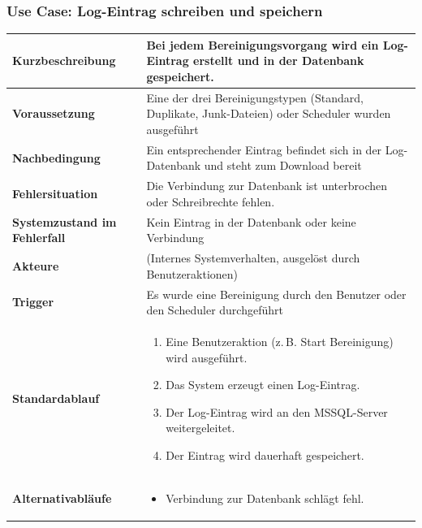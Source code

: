 \subsubsection*{Use Case: Log-Eintrag schreiben und speichern}
\begin{tabular}{|p{5cm}|p{10cm}|}
\hline
\textbf{Kurzbeschreibung} & Bei jedem Bereinigungsvorgang wird ein Log-Eintrag erstellt und in der Datenbank gespeichert. \\
\hline
\textbf{Voraussetzung} & Eine der drei Bereinigungstypen (Standard, Duplikate, Junk-Dateien)  oder Scheduler wurden ausgeführt \\
\hline
\textbf{Nachbedingung} & Ein entsprechender Eintrag befindet sich in der Log-Datenbank und steht zum Download bereit \\
\hline
\textbf{Fehlersituation} & Die Verbindung zur Datenbank ist unterbrochen oder Schreibrechte fehlen. \\
\hline
\textbf{Systemzustand im Fehlerfall} & Kein Eintrag in der Datenbank oder keine Verbindung \\
\hline
\textbf{Akteure} & (Internes Systemverhalten, ausgelöst durch Benutzeraktionen) \\
\hline
\textbf{Trigger} & Es wurde eine Bereinigung durch den Benutzer oder den Scheduler durchgeführt \\
\hline
\textbf{Standardablauf} &
\begin{enumerate}
    \item Eine Benutzeraktion (z.\,B. Start Bereinigung) wird ausgeführt.
    \item Das System erzeugt einen Log-Eintrag.
    \item Der Log-Eintrag wird an den MSSQL-Server weitergeleitet.
    \item Der Eintrag wird dauerhaft gespeichert.
\end{enumerate}
\\
\hline
\textbf{Alternativabläufe} &
\begin{itemize}
    \item Verbindung zur Datenbank schlägt fehl.
\end{itemize}
\\
\hline
\end{tabular}